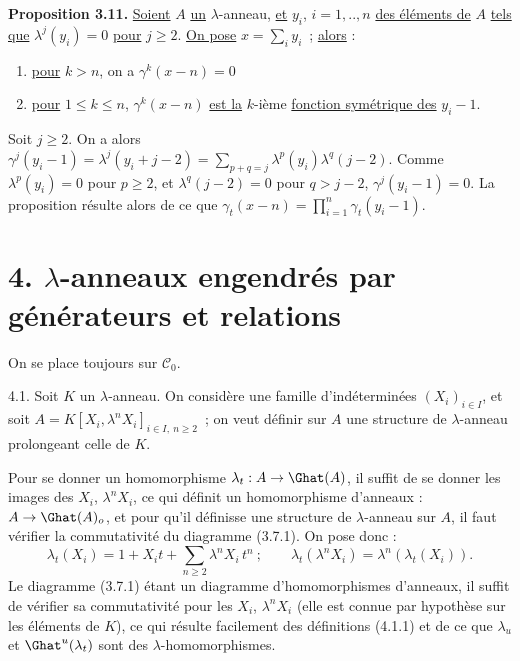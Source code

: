 
\textbf{Proposition 3.11.} \uline{Soient} \(A\) \uline{un} \(\lambda\)-anneau, \uline{et} \(y_i\), \(i=1,..,n\) \uline{des éléments de} \(A\) \uline{tels que} \(\lambda^j(y_i)=0\) \uline{pour} \(j\ge2\). \uline{On pose} \(x=\sum_i y_i\)~; \uline{alors} :
\begin{enumerate}[label=\roman*)]
\item \uline{pour} \(k>n\), on a \(\gamma^k(x-n)=0\)
\item \uline{pour} \(1\le k\le n\), \(\gamma^k(x-n)\) \uline{est la} \(k\)-ième \uline{fonction symétrique des} \(y_i-1\).
\end{enumerate}
Soit \(j\ge2\). On a alors \(\gamma^j(y_i-1)=\lambda^j(y_i+j-2)=\sum_{p+q=j}\lambda^p(y_i)\lambda^q(j-2)\). Comme \(\lambda^p(y_i)=0\) pour \(p\ge2\), et \(\lambda^q(j-2)=0\) pour \(q>j-2\), \(\gamma^j(y_i-1)=0\). La proposition résulte alors de ce que \(\gamma_t(x-n)=\prod_{i=1}^{n}\gamma_t(y_i-1)\).

\section*{4. \(\lambda\)-anneaux engendrés par générateurs et relations}

On se place toujours sur \(\mathcal C_0\).

4.1. Soit \(K\) un \(\lambda\)-anneau. On considère une famille d'indéterminées \((X_i)_{i\in I}\), et soit \(A=K[X_i,\lambda^n X_i]_{i\in I,\ n\ge2}\)~; on veut définir sur \(A\) une structure de \(\lambda\)-anneau prolongeant celle de \(K\).

Pour se donner un homomorphisme \(\lambda_t:A\to\Ghat(A)\), il suffit de se donner les images des \(X_i\), \(\lambda^n X_i\), ce qui définit un homomorphisme d'anneaux : \(A\to\Ghat(A)_o\), et pour qu'il définisse une structure de \(\lambda\)-anneau sur \(A\), il faut vérifier la commutativité du diagramme (3.7.1). On pose donc :
\begin{equation}\tag{4.1.1}
  \lambda_t(X_i)=1+X_it+\sum_{n\ge2}\lambda^n X_i\,t^n~;
  \qquad
  \lambda_t(\lambda^n X_i)=\lambda^n(\lambda_t(X_i)).
\end{equation}
Le diagramme (3.7.1) étant un diagramme d'homomorphismes d'anneaux, il suffit de vérifier sa commutativité pour les \(X_i\), \(\lambda^n X_i\) (elle est connue par hypothèse sur les éléments de \(K\)), ce qui résulte facilement des définitions (4.1.1) et de ce que \(\lambda_u\) et \(\Ghat^u(\lambda_t)\) sont des \(\lambda\)-homomorphismes.


